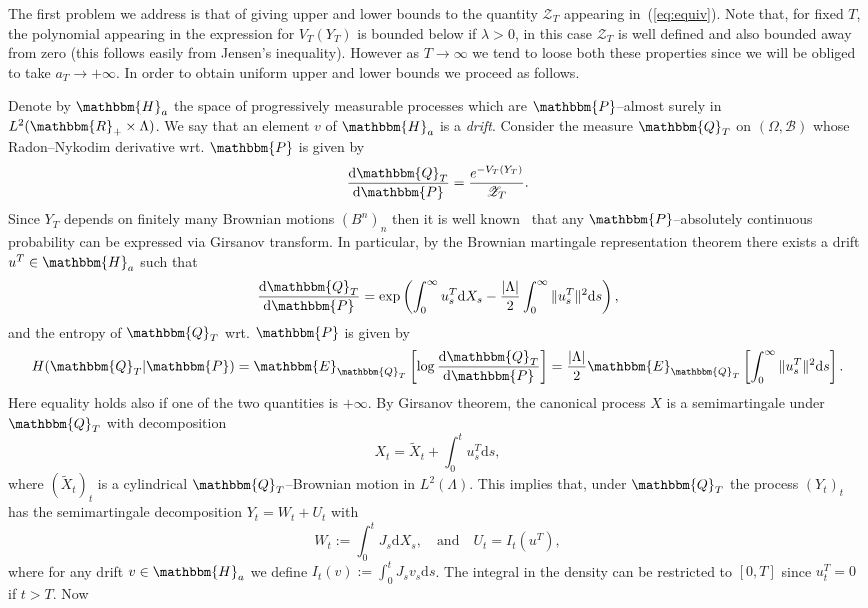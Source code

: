 \documentclass[11pt, oneside]{article}   	%
\newcommand{\assign}{:=}
\newcommand{\mathd}{\mathrm{d}}
\newcommand{\tmtextit}[1]{{\itshape{#1}}}
\newcommand{\CB}{\mathscr{B}}
\newcommand{\CZ}{\mathscr{Z}}
\begin{document}
The first problem we address is that of giving upper and lower bounds to the
quantity $\CZ_T$ appearing in~(\ref{eq:equiv}). Note that, for fixed $T$, the
polynomial appearing in the expression for $V_T (Y_T)$ is bounded below if
$\lambda > 0$, in this case $\CZ_T$ is well defined and also bounded away from
zero (this follows easily from Jensen's inequality). However as $T \rightarrow
\infty$ we tend to loose both these properties since we will be obliged to
take $a_T \rightarrow + \infty$. In order to obtain uniform upper and lower
bounds we proceed as follows.

Denote by $\mathbbm{H}_a$ the space of progressively measurable processes
which are $\mathbbm{P}$--almost surely in $L^2 (\mathbbm{R}_+ \times
\Lambda)$. We say that an element $v$ of $\mathbbm{H}_a$ is a
\tmtextit{drift}. Consider the measure $\mathbbm{Q}_T$ on $\left( \Omega, \CB
\right)$ whose Radon--Nykodim derivative wrt. $\mathbbm{P}$ is given by
\[ \frac{\mathd \mathbbm{Q}_T}{\mathd \mathbbm{P}} = \frac{e^{- V_T
   (Y_T)}}{\CZ_T} . \]
Since $Y_T$ depends on finitely many Brownian motions $(B^n)_n$ then it is
well known~{\cite{revuz_continuous_2004,follmer_entropy_1985}} that any
$\mathbbm{P}$--absolutely continuous probability can be expressed via Girsanov
transform. In particular, by the Brownian martingale representation theorem
there exists a drift $u^T \in \mathbbm{H}_a$ such that
\[ \frac{\mathd \mathbbm{Q}_T}{\mathd \mathbbm{P}} = \exp \left(
   \int_0^{\infty} u_s^T \mathd X_s - \frac{| \Lambda |}{2} \int_0^{\infty} \|
   u_s^T \|^2 \mathd s \right), \]
and the entropy of $\mathbbm{Q}_T$ wrt. $\mathbbm{P}$ is given by
\[ H (\mathbbm{Q}_T |\mathbbm{P}) =\mathbbm{E}_{\mathbbm{Q}_T} \left[ \log
   \frac{\mathd \mathbbm{Q}_T}{\mathd \mathbbm{P}} \right] = \frac{| \Lambda
   |}{2} \mathbbm{E}_{\mathbbm{Q}_T} \left[ \int_0^{\infty} \| u_s^T \|^2
   \mathd s \right] . \]
Here equality holds also if one of the two quantities is $+ \infty$. By
Girsanov theorem, the canonical process $X$ is a semimartingale under
$\mathbbm{Q}_T$ with decomposition
\[ X_t = \tilde{X}_t + \int_0^t u^T_s \mathd s, \]
where $(\tilde{X}_t)_t$ is a cylindrical $\mathbbm{Q}_T$--Brownian motion in
$L^2 (\Lambda)$. This implies that, under $\mathbbm{Q}_T$ the process
$(Y_t)_t$ has the semimartingale decomposition $Y_t = W_t + U_t$ with
\[ W_t \assign \int_0^t J_s \mathd X_s, \quad \text{and} \quad U_t = I_t
   (u^T), \]
where for any drift $v \in \mathbbm{H}_a$ we define $I_t (v) \assign \int_0^t
J_s v_s \mathd s$. The integral in the density can be restricted to $[0, T]$
since $u_t^T = 0$ if $t > T$. Now
\end{document}
